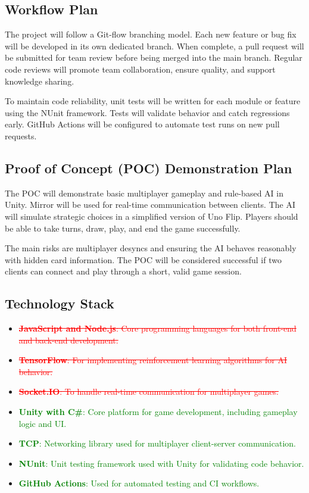 \documentclass[12pt]{article}
\newcommand{\removed}[1]{\textcolor{red}{\sout{#1}}}
\newcommand{\added}[1]{\textcolor{green}{#1}}
\begin{document}
\subsection*{Workflow Plan}
The project will follow a Git-flow branching model. Each new feature or bug fix will be developed in its own dedicated branch. When complete, a pull request will be submitted for team review before being merged into the main branch. Regular code reviews will promote team collaboration, ensure quality, and support knowledge sharing.

To maintain code reliability, unit tests will be written for each module or feature using the NUnit framework. Tests will validate behavior and catch regressions early. GitHub Actions will be configured to automate test runs on new pull requests.

\subsection*{Proof of Concept (POC) Demonstration Plan}
The POC will demonstrate basic multiplayer gameplay and rule-based AI in Unity. Mirror will be used for real-time communication between clients. The AI will simulate strategic choices in a simplified version of Uno Flip. Players should be able to take turns, draw, play, and end the game successfully.

The main risks are multiplayer desyncs and ensuring the AI behaves reasonably with hidden card information. The POC will be considered successful if two clients can connect and play through a short, valid game session.

\subsection*{Technology Stack}
\begin{itemize}
    \item \removed{\textbf{JavaScript and Node.js}: Core programming languages for both front-end and back-end development.}
    \item \removed{\textbf{TensorFlow}: For implementing reinforcement learning algorithms for AI behavior.}
    \item \removed{\textbf{Socket.IO}: To handle real-time communication for multiplayer games.}
    \item \added{\textbf{Unity with C\#}: Core platform for game development, including gameplay logic and UI.}
    \item \added{\textbf{TCP}: Networking library used for multiplayer client-server communication.}
    \item \added{ \textbf{NUnit}: Unit testing framework used with Unity for validating code behavior. }
    \item \added{\textbf{GitHub Actions}: Used for automated testing and CI workflows.}
\end{itemize}
\end{document}
